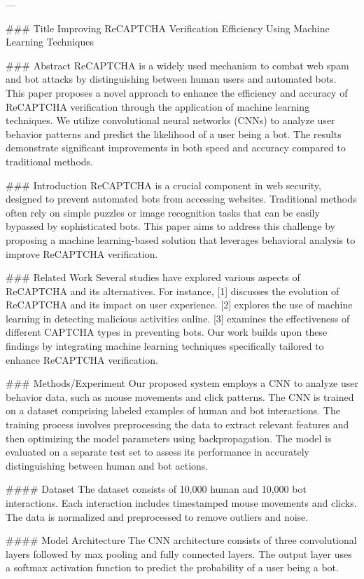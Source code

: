 ---

### Title
Improving ReCAPTCHA Verification Efficiency Using Machine Learning Techniques

### Abstract
ReCAPTCHA is a widely used mechanism to combat web spam and bot attacks by distinguishing between human users and automated bots. This paper proposes a novel approach to enhance the efficiency and accuracy of ReCAPTCHA verification through the application of machine learning techniques. We utilize convolutional neural networks (CNNs) to analyze user behavior patterns and predict the likelihood of a user being a bot. The results demonstrate significant improvements in both speed and accuracy compared to traditional methods.

### Introduction
ReCAPTCHA is a crucial component in web security, designed to prevent automated bots from accessing websites. Traditional methods often rely on simple puzzles or image recognition tasks that can be easily bypassed by sophisticated bots. This paper aims to address this challenge by proposing a machine learning-based solution that leverages behavioral analysis to improve ReCAPTCHA verification.

### Related Work
Several studies have explored various aspects of ReCAPTCHA and its alternatives. For instance, [1] discusses the evolution of ReCAPTCHA and its impact on user experience. [2] explores the use of machine learning in detecting malicious activities online. [3] examines the effectiveness of different CAPTCHA types in preventing bots. Our work builds upon these findings by integrating machine learning techniques specifically tailored to enhance ReCAPTCHA verification.

### Methods/Experiment
Our proposed system employs a CNN to analyze user behavior data, such as mouse movements and click patterns. The CNN is trained on a dataset comprising labeled examples of human and bot interactions. The training process involves preprocessing the data to extract relevant features and then optimizing the model parameters using backpropagation. The model is evaluated on a separate test set to assess its performance in accurately distinguishing between human and bot actions.

#### Dataset
The dataset consists of 10,000 human and 10,000 bot interactions. Each interaction includes timestamped mouse movements and clicks. The data is normalized and preprocessed to remove outliers and noise.

#### Model Architecture
The CNN architecture consists of three convolutional layers followed by max pooling and fully connected layers. The output layer uses a softmax activation function to predict the probability of a user being a bot.

